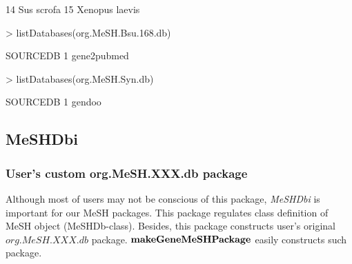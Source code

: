 \documentclass[11pt]{article}
\newcommand{\Rpackage}[1]{{\textit{#1}}}
\begin{document}
\begin{center}
\begin{Schunk}
\begin{Soutput}
14                                   Sus scrofa
15                               Xenopus laevis
\end{Soutput}
\begin{Sinput}
> listDatabases(org.MeSH.Bsu.168.db)
\end{Sinput}
\begin{Soutput}
     SOURCEDB
1 gene2pubmed
\end{Soutput}
\begin{Sinput}
> listDatabases(org.MeSH.Syn.db)
\end{Sinput}
\begin{Soutput}
  SOURCEDB
1   gendoo
\end{Soutput}
\end{Schunk}
\end{center}

\clearpage
\subsection{MeSHDbi}
\subsubsection{User's custom org.MeSH.XXX.db package}
Although most of users may not be conscious of this package, \Rpackage{MeSHDbi} is important for our MeSH packages. This package regulates class definition of MeSH object (MeSHDb-class). Besides, this package constructs user's original $org.MeSH.XXX.db$ package. $\bf{makeGeneMeSHPackage}$ easily constructs such package.
\end{document}

